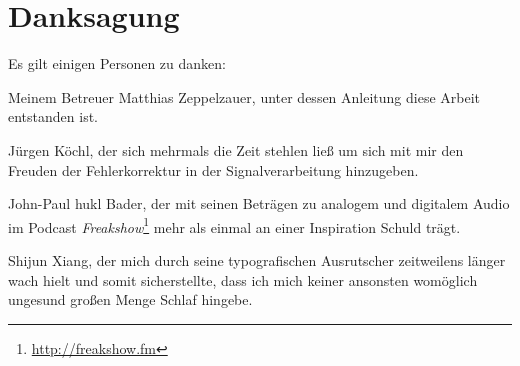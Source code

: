\chapter*{Danksagung}

Es gilt einigen Personen zu danken:

Meinem Betreuer Matthias Zeppelzauer, unter dessen Anleitung diese Arbeit entstanden ist.

J\"urgen K\"ochl, der sich mehrmals die Zeit stehlen lie{\ss} um sich mit mir den Freuden der Fehlerkorrektur in der Signalverarbeitung hinzugeben.

John-Paul \glqq hukl\grqq{} Bader, der mit seinen Betr\"agen zu analogem und digitalem Audio im Podcast \emph{Freakshow}\footnote{\url{http://freakshow.fm}} mehr als einmal an einer Inspiration Schuld tr\"agt. 

Shijun Xiang, der mich durch seine typografischen Ausrutscher zeitweilens l\"anger wach hielt und somit sicherstellte, dass ich mich keiner ansonsten wom\"oglich ungesund gro{\ss}en Menge Schlaf hingebe. 
